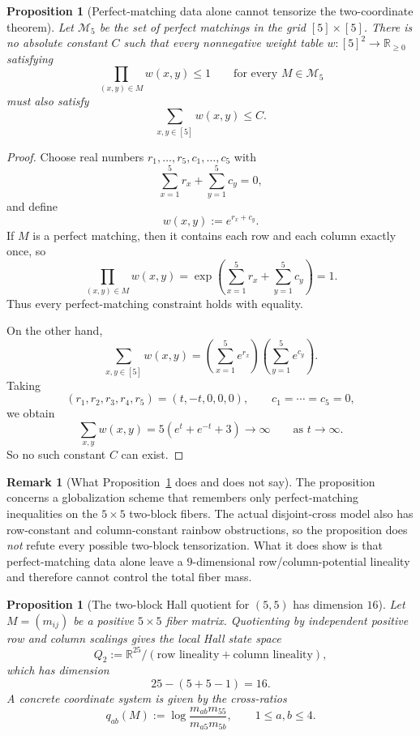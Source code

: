 \documentclass[11pt]{article}
\newtheorem{proposition}[theorem]{Proposition}
\theoremstyle{definition}
\newtheorem{remark}[theorem]{Remark}
\newcommand{\R}{\mathbb{R}}
\newcommand{\1}{\mathbf{1}}
\begin{document}
\begin{proposition}[Perfect-matching data alone cannot tensorize the two-coordinate theorem]\label{prop:555-perfect-matching-lineality}
Let $\mathcal M_5$ be the set of perfect matchings in the grid $[5]\times [5]$. There is no absolute constant $C$ such that every nonnegative weight table $w:[5]^2\to \R_{\ge 0}$ satisfying
\[
\prod_{(x,y)\in M} w(x,y)\le 1
\qquad\text{for every }M\in \mathcal M_5
\]
must also satisfy
\[
\sum_{x,y\in [5]} w(x,y)\le C.
\]
\end{proposition}

\begin{proof}
Choose real numbers $r_1,\dots,r_5,c_1,\dots,c_5$ with
\[
\sum_{x=1}^5 r_x+\sum_{y=1}^5 c_y=0,
\]
and define
\[
w(x,y):=e^{r_x+c_y}.
\]
If $M$ is a perfect matching, then it contains each row and each column exactly once, so
\[
\prod_{(x,y)\in M} w(x,y)
=
\exp\!\left(\sum_{x=1}^5 r_x+\sum_{y=1}^5 c_y\right)=1.
\]
Thus every perfect-matching constraint holds with equality.

On the other hand,
\[
\sum_{x,y\in [5]} w(x,y)
=
\left(\sum_{x=1}^5 e^{r_x}\right)\left(\sum_{y=1}^5 e^{c_y}\right).
\]
Taking
\[
(r_1,r_2,r_3,r_4,r_5)=(t,-t,0,0,0),
\qquad
c_1=\cdots=c_5=0,
\]
we obtain
\[
\sum_{x,y} w(x,y)=5(e^t+e^{-t}+3)\to\infty
\qquad\text{as }t\to\infty.
\]
So no such constant $C$ can exist.
\end{proof}

\begin{remark}[What Proposition~\ref{prop:555-perfect-matching-lineality} does and does not say]\label{rem:555-perfect-matching}
The proposition concerns a globalization scheme that remembers only perfect-matching inequalities on the $5\times 5$ two-block fibers. The actual disjoint-cross model also has row-constant and column-constant rainbow obstructions, so the proposition does \emph{not} refute every possible two-block tensorization. What it does show is that perfect-matching data alone leave a $9$-dimensional row/column-potential lineality and therefore cannot control the total fiber mass.
\end{remark}



\begin{proposition}[The two-block Hall quotient for $(5,5)$ has dimension $16$]\label{prop:555-hall-quotient}
Let $M=(m_{ij})$ be a positive $5\times 5$ fiber matrix.
Quotienting by independent positive row and column scalings gives the local Hall state space
\[
Q_2:=\R^{25}/(\text{row lineality}+\text{column lineality}),
\]
which has dimension
\[
25-(5+5-1)=16.
\]
A concrete coordinate system is given by the cross-ratios
\[
q_{ab}(M):=\log\frac{m_{ab}m_{55}}{m_{a5}m_{5b}},
\qquad
1\le a,b\le 4.
\]
\end{proposition}
\end{document}
